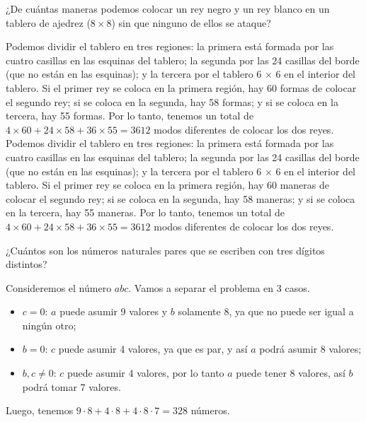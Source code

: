 \documentclass[11pt]{scrartcl}
\begin{document}
\begin{problem}
¿De cuántas maneras podemos colocar un rey negro y un rey blanco en un tablero de ajedrez (\(8 \times 8\)) sin que ninguno de ellos se ataque?
\begin{hint}
Podemos dividir el tablero en tres regiones: la primera está formada por las cuatro casillas en las esquinas del tablero; la segunda por las 24 casillas del borde (que no están en las esquinas); y la tercera por el tablero 6 × 6 en el interior del tablero. Si el primer rey se coloca en la primera región, hay 60 formas de colocar el segundo rey; si se coloca en la segunda, hay 58 formas; y si se coloca en la tercera, hay 55 formas. Por lo tanto, tenemos un total de $4 \times 60 + 24 \times 58 + 36 \times 55 = 3612$ modos diferentes de colocar los dos reyes.\\

Podemos dividir el tablero en tres regiones: la primera está formada por las cuatro casillas en las esquinas del tablero; la segunda por las 24 casillas del borde (que no están en las esquinas); y la tercera por el tablero 6 × 6 en el interior del tablero. Si el primer rey se coloca en la primera región, hay 60 maneras de colocar el segundo rey; si se coloca en la segunda, hay 58 maneras; y si se coloca en la tercera, hay 55 maneras. Por lo tanto, tenemos un total de $4 \times 60 + 24 \times 58 + 36 \times 55 = 3612$ modos diferentes de colocar los dos reyes.
\end{hint}
\end{problem}

\begin{problem}
¿Cuántos son los números naturales pares que se escriben con tres dígitos distintos?
\begin{hint}
Consideremos el número $abc$. Vamos a separar el problema en 3 casos.\begin{itemize}
\item $c = 0$: $a$ puede asumir 9 valores y $b$ solamente 8, ya que no puede ser igual a ningún otro;
\item $b = 0$: $c$ puede asumir 4 valores, ya que es par, y así $a$ podrá asumir 8 valores;
\item $b, c \neq 0$: $c$ puede asumir 4 valores, por lo tanto $a$ puede tener 8 valores, así \(b\) podrá tomar 7 valores.
\end{itemize}
Luego, tenemos \(9\cdot 8 + 4\cdot 8 + 4\cdot 8\cdot 7 = 328\) números.
\end{hint}
\end{problem}
\end{document}
